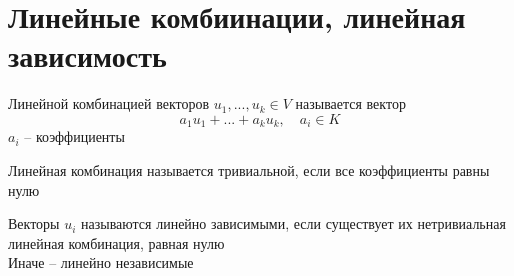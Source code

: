 \section{Линейные комбиинации, линейная зависимость}

\begin{definition}
	Линейной комбинацией векторов $u_1, ..., u_k \in V$ называется вектор
    $$ a_1u_1 + ... + a_ku_k, \quad a_i \in K $$
    $a_i$ -- коэффициенты
\end{definition}

\begin{definition}
	Линейная комбинация называется тривиальной, если все коэффициенты равны нулю
\end{definition}

\begin{definition}
	Векторы $u_i$ называются линейно зависимыми, если существует их нетривиальная линейная комбинация, равная нулю \\
    Иначе -- линейно независимые
\end{definition}

